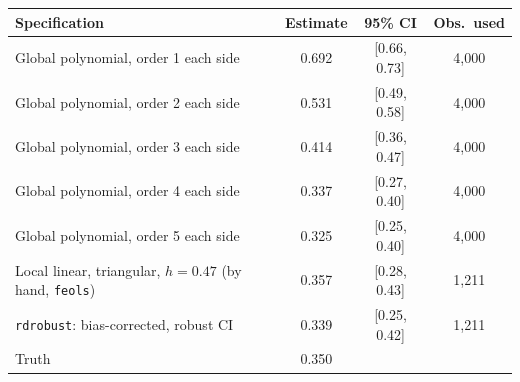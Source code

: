 \begin{tabular}{lccc}\toprule
Specification & Estimate & 95\% CI & Obs.\ used \\ \midrule
Global polynomial, order 1 each side & 0.692 & [0.66, 0.73] & 4,000 \\
Global polynomial, order 2 each side & 0.531 & [0.49, 0.58] & 4,000 \\
Global polynomial, order 3 each side & 0.414 & [0.36, 0.47] & 4,000 \\
Global polynomial, order 4 each side & 0.337 & [0.27, 0.40] & 4,000 \\
Global polynomial, order 5 each side & 0.325 & [0.25, 0.40] & 4,000 \\
\midrule
Local linear, triangular, $h = 0.47$ (by hand, \texttt{feols}) & 0.357 & [0.28, 0.43] & 1,211 \\
\texttt{rdrobust}: bias-corrected, robust CI & 0.339 & [0.25, 0.42] & 1,211 \\
\midrule
Truth & 0.350 & &  \\
\bottomrule\end{tabular}
